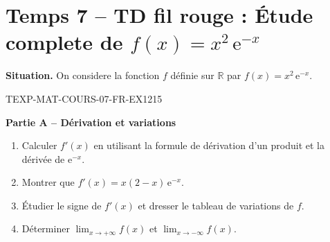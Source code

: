 

\section*{Temps 7 -- TD fil rouge : Étude complete de $f(x) = x^2\,\mathrm{e}^{-x}$}

\textbf{Situation.} On considere la fonction $f$ définie sur $\mathbb{R}$ par $f(x) = x^2\,\mathrm{e}^{-x}$.

\bigskip


\begin{exercice}{TEXP-MAT-COURS-07-FR-EX1}{2}{15}

\textbf{Partie A -- Dérivation et variations}

\begin{enumerate}
  \item Calculer $f'(x)$ en utilisant la formule de dérivation d'un produit et la dérivée de $\mathrm{e}^{-x}$.
  \item Montrer que $f'(x) = x(2-x)\,\mathrm{e}^{-x}$.
  \item Étudier le signe de $f'(x)$ et dresser le tableau de variations de $f$.
  \item Déterminer $\lim_{x \to +\infty} f(x)$ et $\lim_{x \to -\infty} f(x)$.
\end{enumerate}

\end{exercice}

